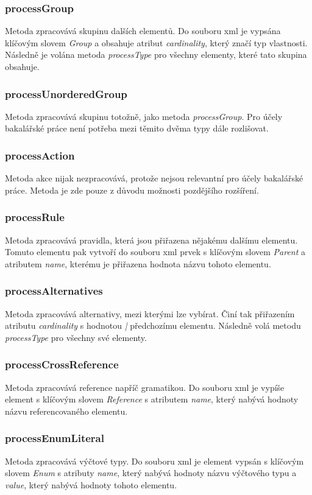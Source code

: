 \subsubsection{processGroup}
Metoda zpracovává skupinu dalších elementů. Do souboru xml je vypsána klíčovým slovem \textit{Group} a obsahuje atribut \textit{cardinality}, který značí typ vlastnosti. Následně je volána metoda \textit{processType} pro všechny elementy, které tato skupina obsahuje.
\subsubsection{processUnorderedGroup}
Metoda zpracovává skupinu totožně, jako metoda \textit{processGroup}. Pro účely bakalářské práce není potřeba mezi těmito dvěma typy dále rozlišovat.
\subsubsection{processAction}
Metoda akce nijak nezpracovává, protože nejsou relevantní pro účely bakalářské práce. Metoda je zde pouze z důvodu možnosti pozdějšího rozšíření.
\subsubsection{processRule}
Metoda zpracovává pravidla, která jsou přiřazena nějakému dalšímu elementu. Tomuto elementu pak vytvoří do souboru xml prvek s klíčovým slovem \textit{Parent} a atributem \textit{name}, kterému je přiřazena hodnota názvu tohoto elementu.
\subsubsection{processAlternatives}
Metoda zpracovává alternativy, mezi kterými lze vybírat. Činí tak přiřazením atributu \textit{cardinality} s hodnotou \textit{|} předchozímu elementu. Následně volá metodu \textit{processType} pro všechny své elementy.
\subsubsection{processCrossReference}
Metoda zpracovává reference napříč gramatikou. Do souboru xml je vypíše element s klíčovým slovem \textit{Reference} s atributem \textit{name}, který nabývá hodnoty názvu referencovaného elementu.
\subsubsection{processEnumLiteral}
Metoda zpracovává výčtové typy. Do souboru xml je element vypsán s klíčovým slovem \textit{Enum} s atributy \textit{name}, který nabývá hodnoty názvu výčtového typu a \textit{value}, který nabývá hodnoty tohoto elementu.

